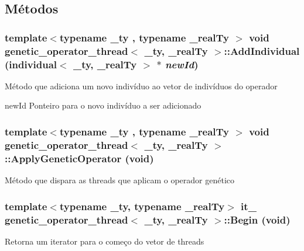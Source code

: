 \subsection{Métodos}
\hypertarget{classgenetic__operator__thread_a5e739f35ac03b42311540dbf4db25d2e}{
\subsubsection[{AddIndividual}]{\setlength{\rightskip}{0pt plus 5cm}template$<$typename \_\-ty , typename \_\-realTy $>$ void {\bf genetic\_\-operator\_\-thread}$<$ \_\-ty, \_\-realTy $>$::AddIndividual ({\bf individual}$<$ \_\-ty, \_\-realTy $>$ $\ast$ {\em newId})}}
\label{classgenetic__operator__thread_a5e739f35ac03b42311540dbf4db25d2e}
Método que adiciona um novo indivíduo ao vetor de indivíduos do operador

newId Ponteiro para o novo indivíduo a ser adicionado \hypertarget{classgenetic__operator__thread_abd1a0cb47d379e74f3e738f5c75fe7b7}{
\subsubsection[{ApplyGeneticOperator}]{\setlength{\rightskip}{0pt plus 5cm}template$<$typename \_\-ty , typename \_\-realTy $>$ void {\bf genetic\_\-operator\_\-thread}$<$ \_\-ty, \_\-realTy $>$::ApplyGeneticOperator (void)}}
\label{classgenetic__operator__thread_abd1a0cb47d379e74f3e738f5c75fe7b7}
Método que dispara as threads que aplicam o operador genético \hypertarget{classgenetic__operator__thread_a3f9defee5440ebe6d973bcc8806d64ee}{
\subsubsection[{Begin}]{\setlength{\rightskip}{0pt plus 5cm}template$<$typename \_\-ty, typename \_\-realTy$>$ {\bf it\_\-} {\bf genetic\_\-operator\_\-thread}$<$ \_\-ty, \_\-realTy $>$::Begin (void)}}
\label{classgenetic__operator__thread_a3f9defee5440ebe6d973bcc8806d64ee}
Retorna um iterator para o começo do vetor de threads

